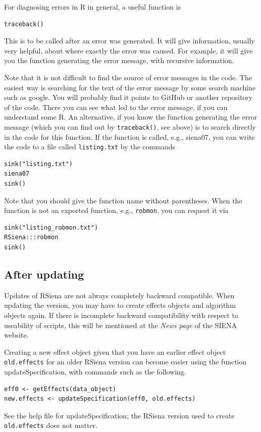 \documentclass[a4paper,fleqn,11pt]{article}
\newcommand{\+}{\, + \,}
\newcommand{\sfn}[1]{\textsf{#1}}
\newcommand{\RS}{{\sf \textsf{RSiena} }}
\newcommand{\SI}{{\sf SIENA }}
\begin{document}
For diagnosing errors in R in general, a useful function is
\begin{verbatim}
traceback()
\end{verbatim}
This is to be called after an error was generated. It will give information,
usually very helpful, about where exactly the error was caused.
For example, it will give you the function generating the error message,
with recursive information.
\medskip

Note that it is not difficult to find the source of error messages in the code.
The easiest way is searching for the text of the error message
by some search machine such as google.
You will probably find it points to GitHub or another repository of the code.
There you can see what led to the error message, if you can understand some R.
An alternative, if you know the function generating the error message
(which you can find out by \texttt{traceback()}, see above)
is to search directly in the code for this function.
If the function is called, e.g., \textsf{siena07}, you can write
the code to a file called \texttt{listing.txt} by the commands
\begin{verbatim}
sink("listing.txt")
siena07
sink()
\end{verbatim}
Note that you should give the function name without parentheses.
When the function is not an exported function, e.g., \texttt{robmon},
you can request it via
\begin{verbatim}
sink("listing_robmon.txt")
RSiena:::robmon
sink()
\end{verbatim}


\subsection{After updating}

\noindent
Updates of \RS are not always completely backward
compatible. When updating the version, you may have to create
effects objects and algorithm objects again. If there is
incomplete backward compatibility with respect to
useability of scripts, this will be mentioned at the \emph{News page}
of the \SI website.

Creating a new effect object given that you have an earlier effect
object \texttt{old.effects} for an older \RS version can become
easier using the function \sfn{updateSpecification},
with commands such as the following.
\begin{verbatim}
eff0 <- getEffects(data_object)
new.effects <- updateSpecification(eff0, old.effects)
\end{verbatim}
See the help file for  \sfn{updateSpecification};
the \RS version used to create \texttt{old.effects} does not matter.
\end{document}
